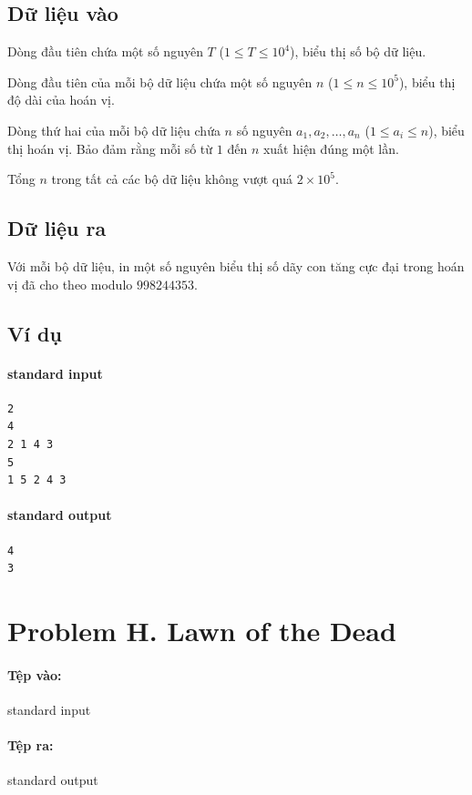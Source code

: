 \documentclass[11pt]{article}
\begin{document}
\subsection*{Dữ liệu vào}

Dòng đầu tiên chứa một số nguyên \(T\) (\(1\le T\le 10^4\)), biểu thị số bộ
dữ liệu.

Dòng đầu tiên của mỗi bộ dữ liệu chứa một số nguyên \(n\)
(\(1\le n\le 10^5\)), biểu thị độ dài của hoán vị.

Dòng thứ hai của mỗi bộ dữ liệu chứa \(n\) số nguyên \(a_1,a_2,\ldots,a_n\)
(\(1\le a_i\le n\)), biểu thị hoán vị. Bảo đảm rằng mỗi số từ \(1\) đến
\(n\) xuất hiện đúng một lần.

Tổng \(n\) trong tất cả các bộ dữ liệu không vượt quá \(2\times 10^5\).

\subsection*{Dữ liệu ra}

Với mỗi bộ dữ liệu, in một số nguyên biểu thị số dãy con tăng cực đại trong
hoán vị đã cho theo modulo \(998244353\).

\subsection*{Ví dụ}

\paragraph{standard input}
\begin{verbatim}
2
4
2 1 4 3
5
1 5 2 4 3
\end{verbatim}

\paragraph{standard output}
\begin{verbatim}
4
3
\end{verbatim}

\section{Problem H. Lawn of the Dead}

\paragraph{Tệp vào:} standard input
\paragraph{Tệp ra:} standard output
\end{document}
